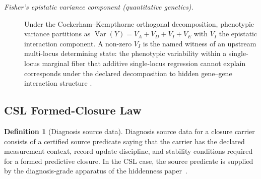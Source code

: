 \documentclass[11pt]{article}
\newcommand{\PaperCSL}{the hiddenness paper}
\theoremstyle{definition}
\newtheorem{definition}[theorem]{Definition}
\begin{document}
\begin{description}
\item[\emph{Fisher's epistatic variance component (quantitative
genetics).}]
Under the Cockerham--Kempthorne orthogonal decomposition,
phenotypic variance partitions as
\(\operatorname{Var}(Y)=V_A+V_D+V_I+V_E\) with
\(V_I\) the epistatic interaction component.  A non-zero \(V_I\) is
the named witness of an upstream multi-locus determining state:
the phenotypic variability within a single-locus marginal fiber
that additive single-locus regression cannot explain corresponds
under the declared decomposition to hidden gene--gene interaction
structure
\citep{Fisher1918CorrelationRelatives}.
\end{description}

\subsection{CSL Formed-Closure Law}\label{sec:access:csl-formed-closure}

\begin{definition}[Diagnosis source data]\label{def:diagnosis-source}
Diagnosis source data for a closure carrier consists of a certified
source predicate saying that the carrier has the declared
measurement context, record update discipline, and stability
conditions required for a formed predictive closure.  In the CSL
case, the source predicate is supplied by the diagnosis-grade
apparatus of \PaperCSL\ \citep{Tsiokos2026CSL}.
\end{definition}
\end{document}
